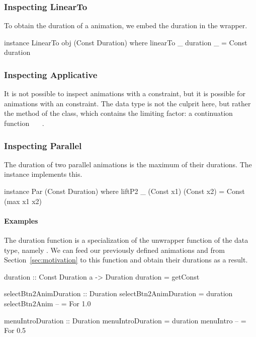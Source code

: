 \subsubsection{Inspecting LinearTo}

To obtain the duration of a  animation, we embed the duration in the  wrapper.

\begin{code}
instance LinearTo obj (Const Duration) where
  linearTo _ duration _ = Const duration
\end{code}

\subsubsection{Inspecting Applicative}

It is not possible to
inspect animations with a  constraint, but it is possible for
animations with an  constraint. The  data type is not
the culprit here, but rather the \hs{>>=} method of the  class, which
contains the limiting factor: a continuation function ~\hs{->}~~.

\subsubsection{Inspecting Parallel}

The duration of two parallel animations is the maximum of their durations. 
The  instance implements this. 

\begin{code}
instance Par (Const Duration) where
  liftP2 _ (Const x1) (Const x2) = Const (max x1 x2)
\end{code}

\paragraph{Examples}

The duration function is a specialization of the unwrapper function of the
 data type, namely . We can feed our previously defined
animations  and  from
Section~\ref{sec:motivation} to this function and obtain their durations as a result.

\begin{code}
duration :: Const Duration a -> Duration
duration = getConst

selectBtn2AnimDuration :: Duration
selectBtn2AnimDuration = duration selectBtn2Anim -- = For 1.0

menuIntroDuration :: Duration
menuIntroDuration = duration menuIntro -- = For 0.5
\end{code}

